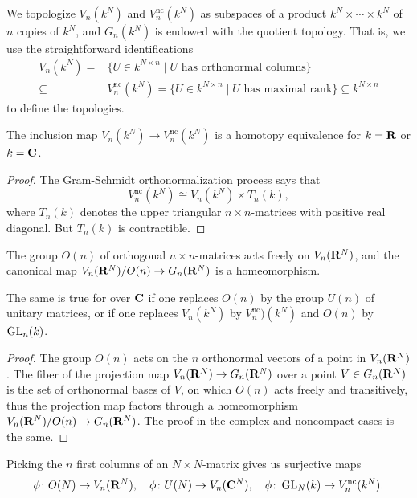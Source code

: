 \documentclass[a4paper,openany]{scrbook}
\begin{document}
We topologize $V_n(k^N)$ and $V_n^{\operatorname{nc}}(k^N)$ as subspaces of a product $k^N \times \cdots \times k^N$ of $n$ copies of $k^N$, and $G_n(k^N)$ is endowed with the quotient topology. That is, we use the straightforward identifications
\begin{align*}
V_n(k^N) = & \{ U \in k^{N \times n} \mid U \text{ has orthonormal columns}\} \\
\subseteq & V_n^{\operatorname{nc}}(k^N) = \{ U \in k^{N \times n} \mid U \text{ has maximal rank}\} \subseteq k^{N \times n}
\end{align*}
to define the topologies.

\begin{lemma}
The inclusion map $V_n(k^N) \to V_n^{\operatorname{nc}}(k^N)$ is a homotopy equivalence for $k=\mathbf R$ or $k=\mathbf C$.
\end{lemma}
\begin{proof}
The Gram-Schmidt orthonormalization process says that
\[
V_n^{\operatorname{nc}}(k^N) \cong V_n(k^N) \times T_n(k),
\]
where $T_n(k)$ denotes the upper triangular $n\times n$-matrices with positive real diagonal. But $T_n(k)$ is contractible.
\end{proof}

\begin{lemma} \label{lemma:principalfibrationongrassmannian}
The group $O(n)$ of orthogonal $n\times n$-matrices acts freely on $V_n(\mathbf R^N)$, and the canonical map $V_n(\mathbf R^N)/O(n) \to G_n(\mathbf R^N)$ is a homeomorphism. 

The same is true for over $\mathbf C$ if one replaces $O(n)$ by the group $U(n)$ of unitary matrices, or if one replaces $V_n(k^N)$ by $V_n^{\operatorname{nc}})(k^N)$ and $O(n)$ by $\operatorname{GL}_n(k)$.
\end{lemma}
\begin{proof}
The group $O(n)$ acts on the $n$ orthonormal vectors of a point in $V_n(\mathbf R^N)$. The fiber of the projection map $V_n(\mathbf R^N) \to G_n(\mathbf R^N)$ over a point $V \in G_n(\mathbf R^N)$ is the set of orthonormal bases of $V$, on which $O(n)$ acts freely and transitively, thus the projection map factors through a homeomorphism $V_n(\mathbf R^N)/O(n) \to G_n(\mathbf R^N)$. The proof in the complex and noncompact cases is the same.
\end{proof}

Picking the $n$ first columns of an $N\times N$-matrix gives us surjective maps
\[
\phi\colon O(N) \to V_n(\mathbf R^N), \quad \phi\colon U(N) \to V_n(\mathbf C^N), \quad \phi\colon \operatorname{GL}_N(k) \to V_n^{\operatorname{nc}}(k^N).
\]
\end{document}
